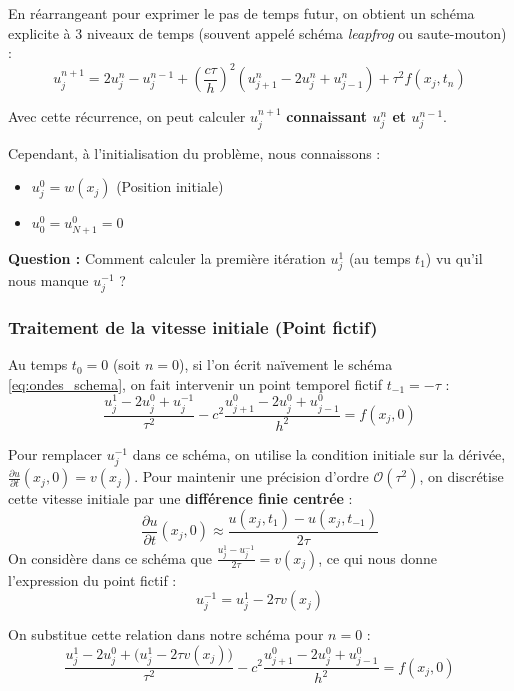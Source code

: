 En réarrangeant pour exprimer le pas de temps futur, on obtient un schéma explicite à 3 niveaux de temps (souvent appelé schéma \textit{leapfrog} ou saute-mouton) :
\begin{equation}
\label{eq:ondes_schema}
u_j^{n+1} = 2u_j^n - u_j^{n-1} + \left(\frac{c \tau}{h}\right)^2 \left( u_{j+1}^n - 2u_j^n + u_{j-1}^n \right) + \tau^2 f(x_j, t_n)
\end{equation}

Avec cette récurrence, on peut calculer $u_j^{n+1}$ \textbf{connaissant $u_j^n$ et $u_j^{n-1}$}.

Cependant, à l'initialisation du problème, nous connaissons :
\begin{itemize}
    \item $u_j^0 = w(x_j)$ (Position initiale)
    \item $u_0^0 = u_{N+1}^0 = 0$
\end{itemize}
\textbf{Question :} Comment calculer la première itération $u_j^1$ (au temps $t_1$) vu qu'il nous manque $u_j^{-1}$ ?

\subsubsection{Traitement de la vitesse initiale (Point fictif)}

Au temps $t_0 = 0$ (soit $n=0$), si l'on écrit naïvement le schéma \eqref{eq:ondes_schema}, on fait intervenir un point temporel fictif $t_{-1} = -\tau$ :
\begin{equation*}
\frac{u_j^1 - 2u_j^0 + u_j^{-1}}{\tau^2} - c^2 \frac{u_{j+1}^0 - 2u_j^0 + u_{j-1}^0}{h^2} = f(x_j, 0)
\end{equation*}

Pour remplacer $u_j^{-1}$ dans ce schéma, on utilise la condition initiale sur la dérivée, $\frac{\partial u}{\partial t}(x_j, 0) = v(x_j)$. Pour maintenir une précision d'ordre $\mathcal{O}(\tau^2)$, on discrétise cette vitesse initiale par une \textbf{différence finie centrée} :
\begin{equation*}
\frac{\partial u}{\partial t}(x_j, 0) \approx \frac{u(x_j, t_1) - u(x_j, t_{-1})}{2\tau}
\end{equation*}
On considère dans ce schéma que $\frac{u_j^1 - u_j^{-1}}{2\tau} = v(x_j)$, ce qui nous donne l'expression du point fictif :
\begin{equation*}
u_j^{-1} = u_j^1 - 2\tau v(x_j)
\end{equation*}

On substitue cette relation dans notre schéma pour $n=0$ :
\begin{equation*}
\frac{u_j^1 - 2u_j^0 + \Big(u_j^1 - 2\tau v(x_j)\Big)}{\tau^2} - c^2 \frac{u_{j+1}^0 - 2u_j^0 + u_{j-1}^0}{h^2} = f(x_j, 0)
\end{equation*}


